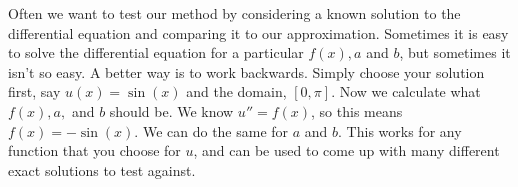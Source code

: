 \documentclass{article}
\def\prog#1{
\vspace{.1in}\begin{mdframed} \begin{center} \textbf{Programming Reminders} \end{center}#1 \end{mdframed} }
\begin{document}
	 Often we want to test our method by considering a known solution to the differential equation and comparing it to our approximation.  Sometimes it is easy to solve the differential equation for a particular $f(x), a $ and $b$, but sometimes it  isn't so easy.  A better way is to work backwards.  Simply choose your solution first, say $u(x) = \sin(x)$ and the domain, $[0,\pi]$.  Now we calculate what $f(x), a, $ and $b$ should be.  We know $u'' = f(x)$, so this means $f(x) = -\sin(x)$.  We  can do the same for $a$ and $b$.  This works for any function that you choose for $u$, and can be used to come up with many different exact solutions to test against.


	 
	 

	
	
 
 	
 	
 	
 	
 	
 	
 	

	
	
	
	
	
	
	
	




\end{document}
